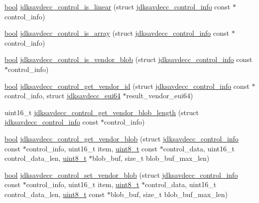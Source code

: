\begin{DoxyCompactItemize}
\item 
\hyperlink{avb__gptp_8h_af6a258d8f3ee5206d682d799316314b1}{bool} \hyperlink{group__aem__control__value__helpers_ga0b354eb586c2e3f60c2189f5aab5d588}{jdksavdecc\+\_\+control\+\_\+is\+\_\+linear} (struct \hyperlink{structjdksavdecc__control__info}{jdksavdecc\+\_\+control\+\_\+info} const $\ast$control\+\_\+info)
\item 
\hyperlink{avb__gptp_8h_af6a258d8f3ee5206d682d799316314b1}{bool} \hyperlink{group__aem__control__value__helpers_ga3cd0412b40dc4667c9ea6be373d2ecf4}{jdksavdecc\+\_\+control\+\_\+is\+\_\+array} (struct \hyperlink{structjdksavdecc__control__info}{jdksavdecc\+\_\+control\+\_\+info} const $\ast$control\+\_\+info)
\item 
\hyperlink{avb__gptp_8h_af6a258d8f3ee5206d682d799316314b1}{bool} \hyperlink{group__aem__control__value__helpers_ga53b43a89e44ea6233fe35bf16aefceeb}{jdksavdecc\+\_\+control\+\_\+is\+\_\+vendor\+\_\+blob} (struct \hyperlink{structjdksavdecc__control__info}{jdksavdecc\+\_\+control\+\_\+info} const $\ast$control\+\_\+info)
\item 
\hyperlink{avb__gptp_8h_af6a258d8f3ee5206d682d799316314b1}{bool} \hyperlink{group__aem__control__value__helpers_gaf184b1a8967843c3112be95b37a9a76a}{jdksavdecc\+\_\+control\+\_\+get\+\_\+vendor\+\_\+id} (struct \hyperlink{structjdksavdecc__control__info}{jdksavdecc\+\_\+control\+\_\+info} const $\ast$control\+\_\+info, struct \hyperlink{structjdksavdecc__eui64}{jdksavdecc\+\_\+eui64} $\ast$result\+\_\+vendor\+\_\+eui64)
\item 
uint16\+\_\+t \hyperlink{group__aem__control__value__helpers_ga71f228e1833c0c473d169504cbfd082c}{jdksavdecc\+\_\+control\+\_\+get\+\_\+vendor\+\_\+blob\+\_\+length} (struct \hyperlink{structjdksavdecc__control__info}{jdksavdecc\+\_\+control\+\_\+info} const $\ast$control\+\_\+info)
\item 
\hyperlink{avb__gptp_8h_af6a258d8f3ee5206d682d799316314b1}{bool} \hyperlink{group__aem__control__value__helpers_ga9f331877ea252b0eb1d5d11af7fc0ac6}{jdksavdecc\+\_\+control\+\_\+get\+\_\+vendor\+\_\+blob} (struct \hyperlink{structjdksavdecc__control__info}{jdksavdecc\+\_\+control\+\_\+info} const $\ast$control\+\_\+info, uint16\+\_\+t item, \hyperlink{stdint_8h_aba7bc1797add20fe3efdf37ced1182c5}{uint8\+\_\+t} const $\ast$control\+\_\+data, uint16\+\_\+t control\+\_\+data\+\_\+len, \hyperlink{stdint_8h_aba7bc1797add20fe3efdf37ced1182c5}{uint8\+\_\+t} $\ast$blob\+\_\+buf, size\+\_\+t blob\+\_\+buf\+\_\+max\+\_\+len)
\item 
\hyperlink{avb__gptp_8h_af6a258d8f3ee5206d682d799316314b1}{bool} \hyperlink{group__aem__control__value__helpers_ga76239936d0d8865d1aec333df56dc8a3}{jdksavdecc\+\_\+control\+\_\+set\+\_\+vendor\+\_\+blob} (struct \hyperlink{structjdksavdecc__control__info}{jdksavdecc\+\_\+control\+\_\+info} const $\ast$control\+\_\+info, uint16\+\_\+t item, \hyperlink{stdint_8h_aba7bc1797add20fe3efdf37ced1182c5}{uint8\+\_\+t} $\ast$control\+\_\+data, uint16\+\_\+t control\+\_\+data\+\_\+len, \hyperlink{stdint_8h_aba7bc1797add20fe3efdf37ced1182c5}{uint8\+\_\+t} const $\ast$blob\+\_\+buf, size\+\_\+t blob\+\_\+buf\+\_\+max\+\_\+len)

\end{DoxyCompactItemize}
